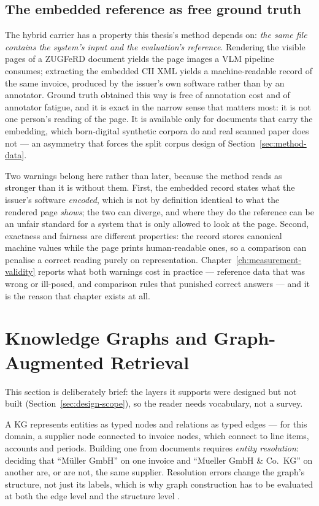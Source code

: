 \subsection{The embedded reference as free ground truth}

The hybrid carrier has a property this thesis's method depends on: \emph{the same file
contains the system's input and the evaluation's reference}. Rendering the visible pages
of a \ac{ZUGFeRD} document yields the page images a \ac{VLM} pipeline consumes;
extracting the embedded \ac{CII} \ac{XML} yields a machine-readable record of the same
invoice, produced by the issuer's own software rather than by an annotator.
Ground truth obtained this way is free of annotation cost and of annotator fatigue, and
it is exact in the narrow sense that matters most: it is not one person's reading of the
page. It is available only for documents that carry the embedding, which born-digital
synthetic corpora do and real scanned paper does not --- an asymmetry that forces the split
corpus design of Section~\ref{sec:method-data}.

Two warnings belong here rather than later, because the method reads as stronger than it
is without them. First, the embedded record states what the issuer's software
\emph{encoded}, which is not by definition identical to what the rendered page
\emph{shows}; the two can diverge, and where they do the reference can be an unfair
standard for a system that is only allowed to look at the page. Second, exactness and
fairness are different properties: the record stores canonical machine values while the
page prints human-readable ones, so a comparison can penalise a correct reading purely on
representation. Chapter~\ref{ch:measurement-validity} reports what both warnings cost in
practice --- reference data that was wrong or ill-posed, and comparison rules that punished
correct answers --- and it is the reason that chapter exists at all.

\section{Knowledge Graphs and Graph-Augmented Retrieval}
\label{sec:bg-kg}

This section is deliberately brief: the layers it supports were designed but not built
(Section~\ref{sec:design-scope}), so the reader needs vocabulary, not a survey.

A \ac{KG} represents entities as typed nodes and relations as typed edges --- for this
domain, a supplier node connected to invoice nodes, which connect to line items,
accounts and periods. Building one from documents requires \emph{entity resolution}:
deciding that ``M\"uller GmbH'' on one invoice and ``Mueller GmbH \& Co.\ KG'' on
another are, or are not, the same supplier. Resolution errors change the graph's
structure, not just its labels, which is why graph construction has to be evaluated at
both the edge level and the structure level \parencite{cai2025}.

